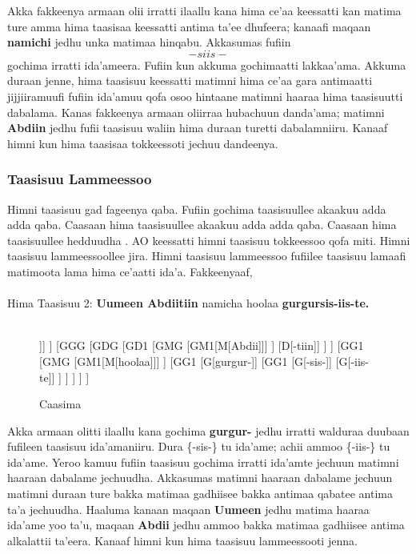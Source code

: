 \documentclass[11pt,b5paper]{book}
\begin{document}
Akka fakkeenya armaan olii irratti ilaallu kana hima ce'aa keessatti kan matima ture amma hima taasisaa keessatti antima ta'ee dhufeera; kanaafi maqaan \textbf{namichi} jedhu unka matimaa hinqabu. Akkasumas fufiin \[-siis-\] gochima irratti ida'ameera. Fufiin kun akkuma gochimaatti lakkaa'ama. Akkuma duraan jenne, hima taasisuu keessatti matimni hima ce'aa gara antimaatti jijjiiramuufi fufiin ida'amuu qofa osoo hintaane matimni haaraa hima taasisuutti dabalama. Kanas fakkeenya armaan oliirraa hubachuun danda'ama; matimni \textbf{Abdiin} jedhu fufii taasisuu waliin hima duraan turetti dabalamniiru. Kanaaf himni kun hima taasisaa tokkeessoti jechuu dandeenya.

\subsubsection{Taasisuu Lammeessoo}
 Himni taasisuu gad fageenya qaba. Fufiin gochima taasisuullee akaakuu adda adda qaba. Caasaan hima taasisuullee akaakuu adda adda qaba. Caasaan hima taasisuullee hedduudha . AO keessatti himni taasisuu tokkeessoo qofa miti. Himni taasisuu lammeessoollee jira. Himni taasisuu lammeessoo fufiilee taasisuu lamaafi matimoota lama hima ce'aatti ida'a. Fakkeenyaaf,\\
 \\
 Hima Taasisuu 2: \textbf{Uumeen Abdiitiin} namicha hoolaa \textbf{gurgursis-iis-te.}\\
 \\
 \begin{figure}[H]
 	\caption{Caasima}
 	\centering
 	\begin{forest}
 		[H
 			[GMG
 				[GM1[M[Uumeen]]]
 			]
 			[GGG
 				[GDG
 					[GD1
 						[GMG
 							[GM1[M[Abdii]]]
 						]
 						[D[-tiin]]
 					]
 				]
 				[GG1
 					[GMG
 						[GM1[M[hoolaa]]]
 					]
 					[GG1
 						[G[gurgur-]]
 						[GG1
 							[G[-sis-]]
 							[G[-iis-te]]
 						]
 					]
 				]
 			]
 		]
 	\end{forest}
 \end{figure}

Akka armaan olitti ilaallu kana gochima \textbf{gurgur-} jedhu irratti walduraa duubaan fufileen taasisuu ida'amaniiru. Dura \{-sis-\} tu ida'ame; achii ammoo \{-iis-\} tu ida'ame. Yeroo kamuu fufiin
taasisuu gochima irratti ida'amte jechuun matimni haaraan dabalame jechuudha. Akkasumas matimni haaraan dabalame jechuun matimni duraan ture bakka matimaa gadhiisee bakka antimaa qabatee antima ta'a jechuudha. Haaluma kanaan maqaan \textbf{Uumeen} jedhu matima haaraa ida’ame yoo ta’u, maqaan \textbf{Abdii} jedhu ammoo bakka matimaa gadhiisee antima alkalattii ta’eera. Kanaaf himni kun hima taasisuu lammeessooti jenna.
\end{document}
